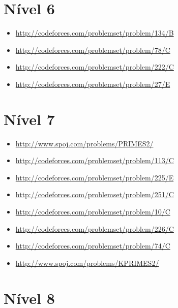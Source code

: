\section{Nível 6}

\begin{itemize}
\item \url{http://codeforces.com/problemset/problem/134/B}
\item \url{http://codeforces.com/problemset/problem/78/C}
\item \url{http://codeforces.com/problemset/problem/222/C}
\item \url{http://codeforces.com/problemset/problem/27/E}
\end{itemize}



\section{Nível 7}

\begin{itemize}
\item \url{http://www.spoj.com/problems/PRIMES2/}
\item \url{http://codeforces.com/problemset/problem/113/C}
\item \url{http://codeforces.com/problemset/problem/225/E}
\item \url{http://codeforces.com/problemset/problem/251/C}
\item \url{http://codeforces.com/problemset/problem/10/C}
\item \url{http://codeforces.com/problemset/problem/226/C}
\item \url{http://codeforces.com/problemset/problem/74/C}
\item \url{http://www.spoj.com/problems/KPRIMES2/}
\end{itemize}



\section{Nível 8}


